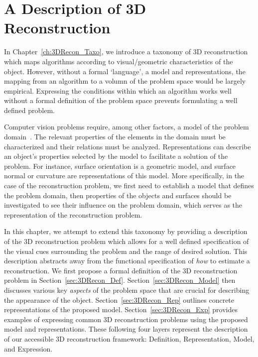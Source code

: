 
\chapter{A Description of 3D Reconstruction}
\label{ch:3DRecon_Desc}
In Chapter~\ref{ch:3DRecon_Taxo}, we introduce a taxonomy of 3D reconstruction which maps algorithms according to visual/geometric characteristics of the object. However, without a formal `language', \ie a model and representations, the mapping from an algorithm to a volumn of the problem space would be largely empirical. Expressing the conditions within which an algorithm works well without a formal definition of the problem space prevents formulating a well defined problem.

Computer vision problems require, among other factors, a model of the problem domain~\cite{little1985phdthesis}. The relevant properties of the elements in the domain must be characterized and their relations must be analyzed. Representations can describe an object's properties selected by the model to facilitate a solution of the problem. For instance, surface orientation is a geometric model, and surface normal or curvature are representations of this model. More specifically, in the case of the reconstruction problem, we first need to establish a model that defines the problem domain, then properties of the objects and surfaces should be investigated to see their influence on the problem domain, which serves as the representation of the reconstruction problem.

In this chapter, we attempt to extend this taxonomy by providing a description of the 3D reconstruction problem which allows for a well defined specification of the visual cues surrounding the problem and the range of desired solution. This description abstracts away from the functional specification of \textit{how} to estimate a reconstruction. We first propose a formal definition of the 3D reconstruction problem in Section~\ref{sec:3DRecon_Def}. Section~\ref{sec:3DRecon_Model} then discusses various key \textit{aspects} of the problem space that are crucial for describing the appearance of the object. Section~\ref{sec:3DRecon_Rep} outlines concrete representations of the proposed model. Section~\ref{sec:3DRecon_Exp} provides examples of expressing common 3D reconstruction problems using the proposed model and representations. These following four layers represent the description of our accessible 3D reconstruction framework: Definition, Representation, Model, and Expression.

